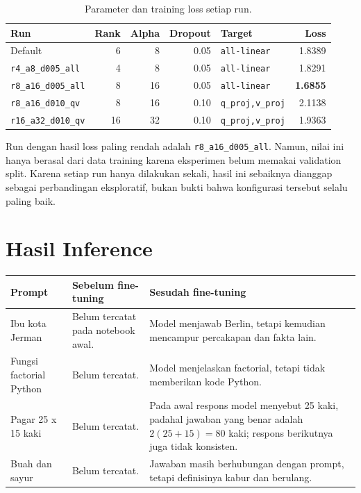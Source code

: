 \documentclass[12pt,a4paper]{article}
\begin{document}
\begin{table}[H]
\centering
\small
\begin{tabular}{lrrrlr}
\toprule
\textbf{Run} & \textbf{Rank} & \textbf{Alpha} & \textbf{Dropout} & \textbf{Target} & \textbf{Loss} \\
\midrule
Default & 6 & 8 & 0.05 & \texttt{all-linear} & 1.8389 \\
\texttt{r4\_a8\_d005\_all} & 4 & 8 & 0.05 & \texttt{all-linear} & 1.8291 \\
\texttt{r8\_a16\_d005\_all} & 8 & 16 & 0.05 & \texttt{all-linear} & \textbf{1.6855} \\
\texttt{r8\_a16\_d010\_qv} & 8 & 16 & 0.10 & \texttt{q\_proj,v\_proj} & 2.1138 \\
\texttt{r16\_a32\_d010\_qv} & 16 & 32 & 0.10 & \texttt{q\_proj,v\_proj} & 1.9363 \\
\bottomrule
\end{tabular}
\caption{Parameter dan training loss setiap run.}
\end{table}

Run dengan hasil loss paling rendah adalah \texttt{r8\_a16\_d005\_all}.
Namun, nilai ini hanya berasal dari data training karena eksperimen belum
memakai validation split. Karena setiap run hanya dilakukan sekali, hasil ini
sebaiknya dianggap sebagai perbandingan eksploratif, bukan bukti bahwa
konfigurasi tersebut selalu paling baik.

\section{Hasil Inference}



\begin{longtable}{p{} p{} p{}}
\toprule
\textbf{Prompt} & \textbf{Sebelum fine-tuning} & \textbf{Sesudah fine-tuning} \\
\midrule
Ibu kota Jerman & Belum tercatat pada notebook awal. & Model menjawab Berlin, tetapi kemudian mencampur percakapan dan fakta lain. \\
Fungsi factorial Python & Belum tercatat. & Model menjelaskan factorial, tetapi tidak memberikan kode Python. \\
Pagar 25 x 15 kaki & Belum tercatat. & Pada awal respons model menyebut 25 kaki, padahal jawaban yang benar adalah $2(25+15)=80$ kaki; respons berikutnya juga tidak konsisten. \\
Buah dan sayur & Belum tercatat. & Jawaban masih berhubungan dengan prompt, tetapi definisinya kabur dan berulang. \\
\bottomrule
\end{longtable}
\end{document}
